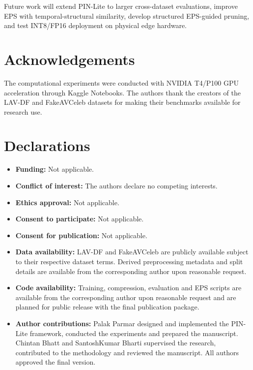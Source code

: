 \documentclass[pdflatex,sn-basic,Numbered]{sn-jnl}
\begin{document}
Future work will extend PIN-Lite to larger cross-dataset evaluations, improve EPS with temporal-structural similarity, develop structured EPS-guided pruning, and test INT8/FP16 deployment on physical edge hardware.

\backmatter

\section*{Acknowledgements}

The computational experiments were conducted with NVIDIA T4/P100 GPU acceleration through Kaggle Notebooks. The authors thank the creators of the LAV-DF and FakeAVCeleb datasets for making their benchmarks available for research use.

\section*{Declarations}

\begin{itemize}
    \item \textbf{Funding:} Not applicable.
    \item \textbf{Conflict of interest:} The authors declare no competing interests.
    \item \textbf{Ethics approval:} Not applicable.
    \item \textbf{Consent to participate:} Not applicable.
    \item \textbf{Consent for publication:} Not applicable.
    \item \textbf{Data availability:} LAV-DF and FakeAVCeleb are publicly available subject to their respective dataset terms. Derived preprocessing metadata and split details are available from the corresponding author upon reasonable request.
    \item \textbf{Code availability:} Training, compression, evaluation and EPS scripts are available from the corresponding author upon reasonable request and are planned for public release with the final publication package.
    \item \textbf{Author contributions:} Palak Parmar designed and implemented the PIN-Lite framework, conducted the experiments and prepared the manuscript. Chintan Bhatt and SantoshKumar Bharti supervised the research, contributed to the methodology and reviewed the manuscript. All authors approved the final version.
\end{itemize}
\end{document}

